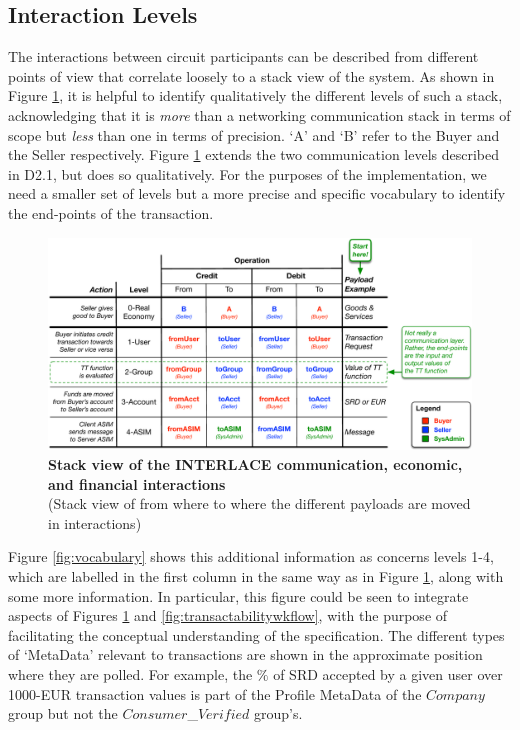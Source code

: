 \subsection{Interaction Levels}
\label{sec:intlevels}
The interactions between circuit participants can be described from different points of view that correlate loosely to a stack view of the system. As shown in Figure \ref{fig:stack}, it is helpful to identify qualitatively the different levels of such a stack, acknowledging that it is \emph{more} than a networking communication stack in terms of scope but \emph{less} than one in terms of precision. `A' and `B' refer to the Buyer and the Seller respectively. Figure \ref{fig:stack} extends the two communication levels described in D2.1, but does so qualitatively. For the purposes of the implementation, we need a smaller set of levels but a more precise and specific vocabulary to identify the end-points of the transaction.

\begin{figure}[H]
\centering
\includegraphics[width=17cm]{Figures/Stack}
\caption{\small\textbf{Stack view of the INTERLACE communication, economic, and financial  interactions}\\
(Stack view of from where to where the different payloads are moved in interactions)}
\label{fig:stack}
\vspace{-0.5cm}
\end{figure}

Figure \ref{fig:vocabulary} shows this additional information as concerns levels 1-4, which are labelled in the first column in the same way as in Figure \ref{fig:stack}, along with some more information. In particular, this figure could be seen to integrate aspects of Figures \ref{fig:stack} and \ref{fig:transactabilitywkflow}, with the purpose of facilitating the conceptual understanding of the specification. The different types of `MetaData' relevant to transactions are shown in the approximate position where they are polled. For example, the $\%$ of SRD accepted by a given user over 1000-EUR transaction values is part of the Profile MetaData of the $Company$ group but not the $Consumer$\_$Verified$ group's.

